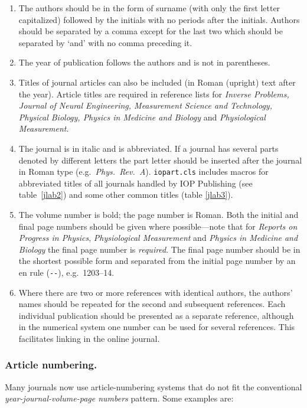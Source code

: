 \documentclass[12pt]{iopart}
\begin{document}
\begin{enumerate}
\item The authors should be in the form of surname (with only the first 
letter capitalized) followed by the initials with no 
periods after the initials. Authors should be separated by a comma 
except for the last two which should be separated by `and' with no 
comma preceding it.

\item The year of publication follows the authors and is not in parentheses.  

\item Titles of journal articles can also be included (in Roman (upright) text after the year). Article titles are required in reference lists for {\it Inverse Problems, Journal of Neural Engineering, Measurement Science and Technology, Physical Biology, Physics in Medicine and Biology\/} and {\it Physiological Measurement}.

\item The journal is in italic and is abbreviated. If a journal has several parts denoted by 
different letters the part letter should be inserted after the journal in Roman type (e.g.\ 
{\it Phys.\ Rev.\ \rm A}). \verb"iopart.cls" includes macros for abbreviated titles of all journals handled by IOP Publishing (see table~\ref{jlab2}) and some other common titles (table \ref{jlab3}). 

\item The volume number is bold; the page number is Roman.
 Both the initial and final page numbers should be given where possible---note that for {\it Reports on Progress in Physics\/}, {\it Physiological Measurement} and {\it Physics in Medicine and Biology}
 the final page number is {\it required}. The final page number should be in 
the shortest possible form and separated from the initial page number by an en rule (\verb"--"), e.g.\ 1203--14.

\item Where there are two or more references with identical authors, 
the authors' names should be repeated for the second and subsequent references. Each individual publication should be presented as a separate reference, although in the numerical system one number can be used for several references. This facilitates linking in the online journal. 
\end{enumerate}


\subsubsection{Article numbering.}
Many journals now use article-numbering systems that do not fit the conventional {\it year-journal-volume-page numbers} pattern. Some examples are:
\end{document}
